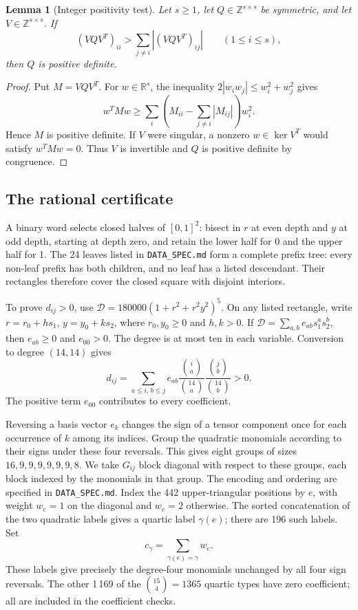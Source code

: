 \documentclass[11pt,a4paper]{amsart}
\numberwithin{equation}{section}
\newtheorem{lemma}[theorem]{Lemma}
\theoremstyle{definition}
\theoremstyle{remark}
\newcommand{\R}{\mathbb R}
\begin{document}
\begin{lemma}[Integer positivity test]\label{lem:integer}
Let $s\ge1$, let $Q\in\mathbb Z^{s\times s}$ be symmetric,
and let $V\in\mathbb Z^{s\times s}$. If
\begin{equation}\label{eq:integercriterion}
 (VQV^T)_{ii}>\sum_{j\ne i}|(VQV^T)_{ij}|\qquad(1\le i\le s),
\end{equation}
then $Q$ is positive definite.
\end{lemma}
\begin{proof}
Put $M=VQV^T$. For $w\in\R^s$, the inequality
$2|w_iw_j|\le w_i^2+w_j^2$ gives
\[
 w^TMw\ge\sum_i\left(M_{ii}-\sum_{j\ne i}|M_{ij}|\right)w_i^2.
\]
Hence $M$ is positive definite. If $V$ were singular, a nonzero
$w\in\ker V^T$ would satisfy $w^TMw=0$. Thus $V$ is invertible
and $Q$ is positive definite by congruence.
\end{proof}

\subsection*{The rational certificate}
A binary word selects closed halves of $[0,1]^2$: bisect in $r$ at
even depth and $y$ at odd depth, starting at depth zero, and retain
the lower half for 0 and the upper half for 1. The 24 leaves listed
in \texttt{DATA\_SPEC.md} form a complete prefix tree: every non-leaf
prefix has both children, and no leaf has a listed descendant.
Their rectangles therefore cover the closed square with disjoint interiors.

To prove $d_{ij}>0$, use $\mathscr D=180000(1+r^2+r^2y^2)^5$.
On any listed rectangle,
write $r=r_0+hs_1$, $y=y_0+ks_2$, where $r_0,y_0\ge0$ and $h,k>0$.
If $\mathscr D=\sum_{a,b}e_{ab}s_1^as_2^b$, then $e_{ab}\ge0$ and
$e_{00}>0$. The degree is at most ten in each variable. Conversion
to degree $(14,14)$ gives
\[
 d_{ij}=\sum_{a\le i,\,b\le j}e_{ab}
 \frac{\binom ia}{\binom{14}a}\frac{\binom jb}{\binom{14}b}>0.
\]
The positive term $e_{00}$ contributes to every coefficient.

Reversing a basis vector $e_k$ changes the sign of a tensor component
once for each occurrence of $k$ among its indices. Group the quadratic
monomials according to their signs under these four reversals.
This gives eight groups of sizes $16,9,9,9,9,9,9,8$. We take
$G_{ij}$ block diagonal with respect to these groups, each block
indexed by the monomials in that group. The encoding and ordering
are specified in \texttt{DATA\_SPEC.md}.
Index the 442 upper-triangular positions by $e$,
with weight $w_e=1$ on the diagonal and $w_e=2$ otherwise.
The sorted concatenation of the two quadratic labels gives a quartic
label $\gamma(e)$; there are 196 such labels. Set
\[
 c_\gamma=\sum_{\gamma(e)=\gamma}w_e.
\]
These labels give precisely the degree-four monomials unchanged by
all four sign reversals.
The other 1\,169 of the $\binom{15}{4}=1365$ quartic types have zero
coefficient; all are included in the coefficient checks.
\end{document}
